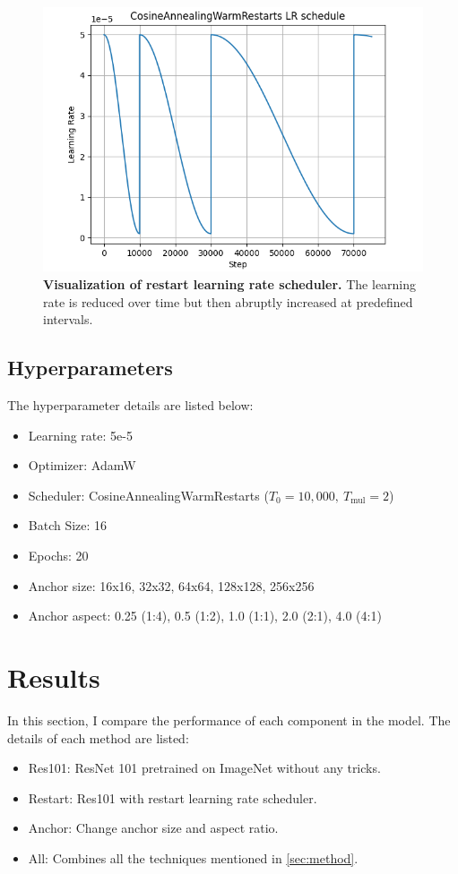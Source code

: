 \documentclass[10pt,twocolumn,letterpaper]{article}
\begin{document}
\begin{figure}[h]
  \centering
  \includegraphics[width=0.8\linewidth]{assets/restart.png}
  \caption{\textbf{Visualization of restart learning rate scheduler.} The learning rate
    is reduced over time but then abruptly increased at predefined intervals.}
  \label{fig:restart}
\end{figure}

\subsection{Hyperparameters}

\noindent The hyperparameter details are listed below:
\begin{itemize}
  \setlength\itemsep{0pt}
  \item Learning rate: 5e-5
  \item Optimizer: AdamW
  \item Scheduler: CosineAnnealingWarmRestarts ($T_0=10,000,\ T_{\text{mul}}=2$)
  \item Batch Size: 16
  \item Epochs: 20
  \item Anchor size: 16x16, 32x32, 64x64, 128x128, 256x256
  \item Anchor aspect: 0.25 (1:4), 0.5 (1:2), 1.0 (1:1), 2.0 (2:1), 4.0 (4:1)
\end{itemize}

\section{Results}

In this section, I compare the performance of each component in the model.
The details of each method are listed:
\begin{itemize}
  \setlength\itemsep{0pt}
  \item Res101: ResNet 101 pretrained on ImageNet without any tricks.
  \item Restart: Res101 with restart learning rate scheduler.
  \item Anchor: Change anchor size and aspect ratio.
  \item All: Combines all the techniques mentioned in \cref{sec:method}.
\end{itemize}
\end{document}
